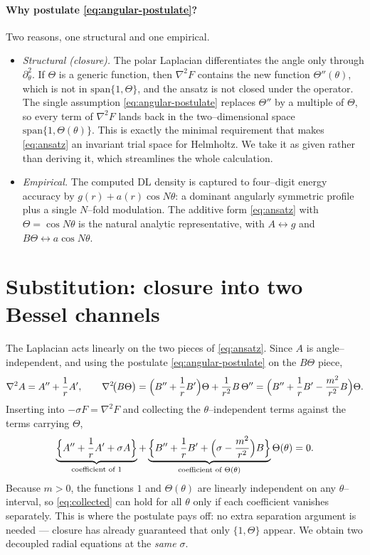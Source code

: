 \documentclass{article}
\begin{document}
\paragraph{Why postulate \eqref{eq:angular-postulate}?} Two reasons, one
structural and one empirical.
\begin{itemize}
\item \emph{Structural (closure).} The polar Laplacian differentiates the angle
only through $\partial_\theta^2$. If $\Theta$ is a generic function, then
$\nabla^2 F$ contains the new function $\Theta''(\theta)$, which is not in
$\mathrm{span}\{1,\Theta\}$, and the ansatz is not closed under the operator.
The single assumption \eqref{eq:angular-postulate} replaces $\Theta''$ by a
multiple of $\Theta$, so every term of $\nabla^2F$ lands back in the
two--dimensional space $\mathrm{span}\{1,\Theta(\theta)\}$. This is exactly the
minimal requirement that makes \eqref{eq:ansatz} an invariant trial space for
Helmholtz. We take it as given rather than deriving it, which streamlines the
whole calculation.
\item \emph{Empirical.} The computed DL density is captured to four--digit energy
accuracy by $g(r)+a(r)\cos N\theta$: a dominant angularly symmetric profile plus
a single $N$--fold modulation. The additive form \eqref{eq:ansatz} with
$\Theta=\cos N\theta$ is the natural analytic representative, with
$A\leftrightarrow g$ and $B\Theta\leftrightarrow a\cos N\theta$.
\end{itemize}

\section{Substitution: closure into two Bessel channels}

The Laplacian acts linearly on the two pieces of \eqref{eq:ansatz}. Since $A$ is
angle--independent, and using the postulate \eqref{eq:angular-postulate} on the
$B\Theta$ piece,
\begin{equation}
\nabla^2 A=A''+\frac1r A',
\qquad
\nabla^2\!\bigl(B\Theta\bigr)
=\Bigl(B''+\frac1r B'\Bigr)\Theta+\frac{1}{r^2}B\,\Theta''
=\Bigl(B''+\frac1r B'-\frac{m^{2}}{r^{2}}B\Bigr)\Theta .
\end{equation}
Inserting into $-\sigma F=\nabla^2 F$ and collecting the $\theta$--independent
terms against the terms carrying $\Theta$,
\begin{equation}
\underbrace{\Bigl\{A''+\frac1r A'+\sigma A\Bigr\}}_{\text{coefficient of }1}
+\underbrace{\Bigl\{B''+\frac1r B'
+\Bigl(\sigma-\frac{m^{2}}{r^{2}}\Bigr)B\Bigr\}}_{\text{coefficient of }\Theta(\theta)}\Theta(\theta)=0 .
\label{eq:collected}
\end{equation}
Because $m>0$, the functions $1$ and $\Theta(\theta)$ are linearly independent on
any $\theta$--interval, so \eqref{eq:collected} can hold for all $\theta$ only if
each coefficient vanishes separately. This is where the postulate pays off: no
extra separation argument is needed --- closure has already guaranteed that only
$\{1,\Theta\}$ appear. We obtain two decoupled radial equations at the
\emph{same} $\sigma$.
\end{document}
